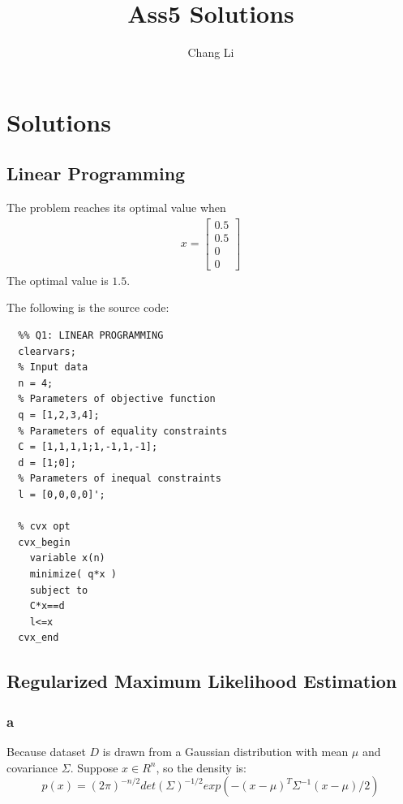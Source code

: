 \message{ !name(ass5_ChangLi.tex)}\documentclass[10pt,a4paper]{article}
\begin{document}

\title{Ass5 Solutions}
\author{Chang Li}
\maketitle

\section{Solutions}

\subsection{Linear Programming}
The problem reaches its optimal value when
\begin{align*}
  x=\begin{bmatrix}
    0.5\\
    0.5\\
    0\\
    0
  \end{bmatrix}
\end{align*}
The optimal value is $1.5$.

The following is the source code:
\begin{lstlisting}
  %% Q1: LINEAR PROGRAMMING
  clearvars;
  % Input data
  n = 4;
  % Parameters of objective function
  q = [1,2,3,4];
  % Parameters of equality constraints
  C = [1,1,1,1;1,-1,1,-1];
  d = [1;0];
  % Parameters of inequal constraints
  l = [0,0,0,0]';

  % cvx opt
  cvx_begin
    variable x(n)
    minimize( q*x )
    subject to
    C*x==d
    l<=x
  cvx_end
\end{lstlisting}

\subsection{Regularized Maximum Likelihood Estimation}

\subsubsection{a}
Because dataset $D$ is drawn from a Gaussian distribution
with mean $\mu$ and covariance $\Sigma$. Suppose $x\in R^n$,
so the density is:
$$p(x) = (2\pi)^{-n/2}det(\Sigma)^{-1/2}exp(-(x-\mu)^T\Sigma^{-1}(x-\mu)/2)$$
\end{document}
